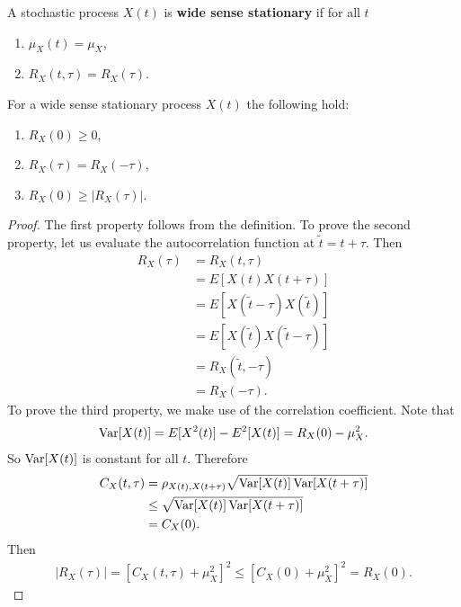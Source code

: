 \documentclass{memoir}
\begin{document}
\begin{definition}
    A stochastic process $X(t)$ is \textbf{wide sense stationary} if for all $t$
    \begin{enumerate}
        \item $\mu_X(t) = \mu_X$,
        \item $R_X(t,\tau)  =R_X(\tau)$.
    \end{enumerate}
\end{definition}

\begin{theorem}
    For a wide sense stationary process $X(t)$ the following hold:
    \begin{enumerate}
        \item $R_X(0) \ge 0$,
        \item $R_X(\tau) = R_X(-\tau)$,
        \item $R_X(0) \ge |R_X(\tau)|$.
    \end{enumerate}
\end{theorem}
\begin{proof}
    The first property follows from the definition. To prove the second property, let us evaluate the autocorrelation function at $\tilde{t} = t + \tau$. Then
    \begin{align*}
        R_X(\tau) &= R_X(t,\tau)\\
        &= E[X(t)X(t+\tau)]\\
        &= E[X(\tilde{t} - \tau) X(\tilde{t})]\\
        &= E[X(\tilde{t}) X(\tilde{t} - \tau)]\\
        &= R_X(\tilde{t}, - \tau)\\
        &= R_X(-\tau).
    \end{align*}
    To prove the third property, we make use of the correlation coefficient. Note that
    \begin{align*}
        \operatorname{Var}[X(t)] = E[X^2(t)] -E^2[X(t)] = R_X(0) - \mu_X^2.
    \end{align*}
    So $\operatorname{Var}[X(t)]$ is constant for all $t$. Therefore
    \begin{align*}
        C_X(t,\tau) &= \rho_{X(t),X(t+\tau)} \sqrt{\operatorname{Var}[X(t)]\operatorname{Var}[X(t+\tau)]}\\
        &\le \sqrt{\operatorname{Var}[X(t)]\operatorname{Var}[X(t+\tau)]}\\
        &= C_X(0).
    \end{align*}
    Then
    \begin{align*}
        |R_X(\tau)| = [ C_X(t,\tau) + \mu_X^2]^2 \le [C_X(0) + \mu_X^2]^2 = R_X(0).
    \end{align*}
\end{proof}
\end{document}
